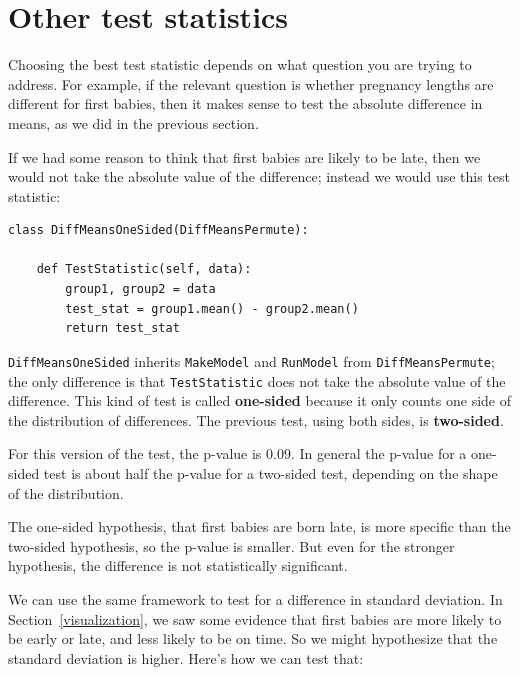 \documentclass[12pt]{book}
\theoremstyle{exercise}
\begin{document}
\section{Other test statistics}

Choosing the best test statistic depends on what question you are
trying to address.  For example, if the relevant question is whether
pregnancy lengths are different for first
babies, then it makes sense to test the absolute difference in means,
as we did in the previous section.%
%

If we had some reason to think that first babies are likely
to be late, then we would not take the absolute value of the difference;
instead we would use this test statistic:

\begin{verbatim}
class DiffMeansOneSided(DiffMeansPermute):

    def TestStatistic(self, data):
        group1, group2 = data
        test_stat = group1.mean() - group2.mean()
        return test_stat
\end{verbatim}

{\tt DiffMeansOneSided} inherits {\tt MakeModel} and {\tt RunModel}
from {\tt DiffMeansPermute}; the only difference is that
{\tt TestStatistic} does not take the absolute value of the
difference.  This kind of test is called {\bf one-sided} because
it only counts one side of the distribution of differences.  The
previous test, using both sides, is {\bf two-sided}.%
%

For this version of the test, the p-value is 0.09.  In general
the p-value for a one-sided test is about half the p-value for
a two-sided test, depending on the shape of the distribution.%

The one-sided hypothesis, that first babies are born late, is more
specific than the two-sided hypothesis, so the p-value is smaller.
But even for the stronger hypothesis, the difference is
not statistically significant.%
%

We can use the same framework to test for a difference in standard
deviation.  In Section~\ref{visualization}, we saw some evidence that
first babies are more likely to be early or late, and less likely to
be on time.  So we might hypothesize that the standard deviation is
higher.  Here's how we can test that:%
\end{document}
